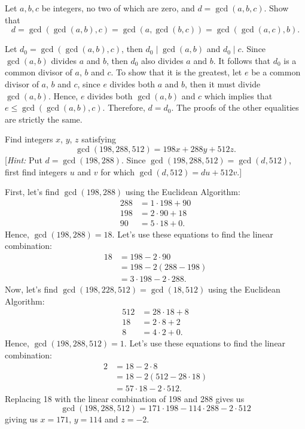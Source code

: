 \begin{exercise}
    Let $a,b,c$ be integers, no two of which are zero, and $d = \gcd(a,b,c)$. Show that 
    $$d = \gcd(\gcd(a,b), c) = \gcd(a, \gcd(b,c)) = \gcd(\gcd(a,c), b).$$
\end{exercise}

\begin{solution}
    Let $d_0 = \gcd(\gcd(a,b), c)$, then $d_0 \mid \gcd(a,b)$ and $d_0 \mid c$. Since $\gcd(a,b)$ divides $a$ and $b$, then $d_0$ also divides $a$ and $b$. It follows that $d_0$ is a common divisor of $a$, $b$ and $c$. To show that it is the greatest, let $e$ be a common divisor of $a$, $b$ and $c$, since $e$ divides both $a$ and $b$, then it must divide $\gcd(a,b)$. Hence, $e$ divides both $\gcd(a,b)$ and $c$ which implies that $e \leq \gcd(\gcd(a,b), c)$. Therefore, $d = d_0$. The proofs of the other equalities are strictly the same. \\
\end{solution}

\begin{exercise}
    Find integers $x$, $y$, $z$ satisfying
    $$\gcd(198, 288, 512) = 198x + 288y + 512z.$$
    [\textit{Hint:} Put $d = \gcd(198, 288)$. Since $\gcd(198, 288, 512) = \gcd(d, 512)$, first find integers $u$ and $v$ for which $\gcd(d, 512) = du + 512v$.] \\
\end{exercise} 

\begin{solution}
    First, let's find $\gcd(198, 288)$ using the Euclidean Algorithm:
    \begin{align*}
        288 &= 1 \cdot 198 + 90 \\
        198 &= 2 \cdot 90 + 18 \\
        90 &= 5 \cdot 18 + 0.
    \end{align*}
    Hence, $\gcd(198, 288) = 18$. Let's use these equations to find the linear combination:
    \begin{align*}
        18 &= 198 - 2\cdot 90 \\
        &= 198 - 2(288 - 198) \\
        &= 3 \cdot 198 - 2 \cdot 288.
    \end{align*}
    Now, let's find $\gcd(198, 228, 512) = \gcd(18, 512)$ using the Euclidean Algorithm:
    \begin{align*}
        512 &= 28 \cdot 18 + 8 \\
        18 &= 2 \cdot 8 + 2 \\
        8 &= 4 \cdot 2 + 0.
    \end{align*}
    Hence, $\gcd(198, 288, 512) = 1$. Let's use these equations to find the linear combination:
    \begin{align*}
        2 &= 18 - 2\cdot 8 \\
        &= 18 - 2(512 - 28 \cdot 18) \\
        &= 57 \cdot 18 - 2 \cdot 512.
    \end{align*}
    Replacing 18 with the linear combination of 198 and 288 gives us
    $$\gcd(198, 288, 512) = 171 \cdot 198 - 114 \cdot 288 - 2 \cdot 512$$
    giving us $x = 171$, $y = 114$ and $z = -2$.
\end{solution}